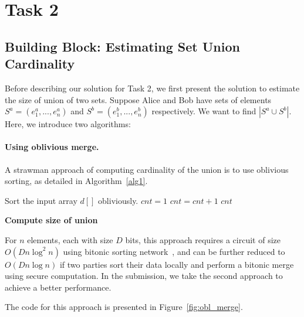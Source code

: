 \section{Task 2}
\subsection{Building Block: Estimating Set Union Cardinality}
Before describing our solution for Task 2, we first present the solution to estimate the size of union of two sets.
Suppose Alice and Bob have sets of elements $S^a = (e^a_1,...,e^a_n)$
and $S^b = (e^b_1,...,e^b_n)$ respectively. We want to find $|S^a\cup S^b|$. Here, we introduce two algorithms:

\paragraph{Using oblivious merge.}
A strawman approach of computing cardinality of the union is to use oblivious sorting, as detailed in Algorithm~\ref{alg1}.

\begin{algorithm}
\begin{algorithmic}[1]
\State Sort the input array $d[]$ obliviously.
\State $cnt = 1$
		\State $cnt = cnt + 1$
	\EndIf
\EndFor
\State\Return $cnt$
\end{algorithmic}
\caption{\textbf{Compute size of union}} %
\label{alg1}
\end{algorithm}
For $n$ elements, each with size $D$ bits, this approach requires a circuit of size $O(Dn\log^2n)$ using bitonic sorting network~\cite{bitonicsort},
and can be further reduced to $O(Dn\log n)$ if two parties sort their data locally and perform a bitonic merge using secure computation.
In the submission, we take the second approach to achieve a better performance.

The code for this approach is presented in Figure~\ref{fig:obl_merge}.

